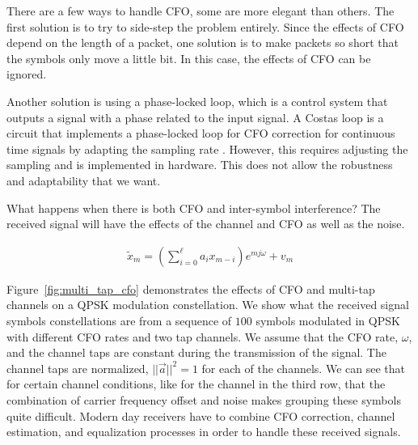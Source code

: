There are a few ways to handle CFO, some are more elegant than others. 
The first solution is to try to side-step the problem entirely.  
Since the effects of CFO depend on the length of a packet, one solution is to make packets so short that the symbols only move a little bit.  In this case, the effects of CFO can be ignored.

Another solution is using a phase-locked loop, which is a control system that outputs a signal with a phase related to the input signal.  
A Costas loop is a circuit that implements a phase-locked loop for CFO correction for continuous time signals by adapting the sampling rate \cite{costas}.  
However, this requires adjusting the sampling and is implemented in hardware.  This does not allow the robustness and adaptability that we want.

What happens when there is both CFO and inter-symbol interference?  The received signal will have the effects of the channel and CFO as well as the noise. 

\begin{align}
\tilde{x}_m = (\sum_{i=0}^{\ell} a_i x_{m-i})e^{mj\omega} + v_m
\end{align}

Figure~\ref{fig:multi_tap_cfo} demonstrates the effects of CFO and multi-tap channels on a QPSK modulation constellation. 
We show what the received signal symbols constellations are from a sequence of $100$ symbols modulated in QPSK with different CFO rates and two tap channels.  We assume that the CFO rate, $\omega$, and the channel taps are constant during the transmission of the signal.  
The channel taps are normalized, $||\vec{a}||^2=1$ for each of the channels. 
We can see that for certain channel conditions, like for the channel in the third row, that the combination of carrier frequency offset and noise makes grouping these symbols quite difficult. 
Modern day receivers have to combine CFO correction, channel estimation, and equalization processes in order to handle these received signals.

